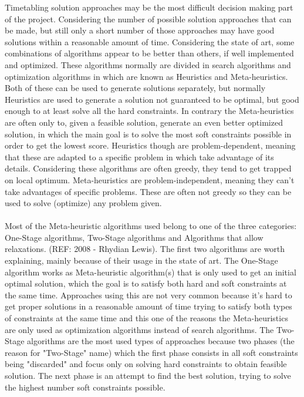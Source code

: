 Timetabling solution approaches may be the most difficult decision making part of the project. Considering the number of possible solution approaches that can be made, but still only a short number of those approaches may have good solutions within a reasonable amount of time. Considering the state of art, some combinations of algorithms appear to be better than others, if well implemented and optimized. These algorithms normally are divided in search algorithms and optimization algorithms in which are known as Heuristics and Meta-heuristics. Both of these can be used to generate solutions separately, but normally Heuristics are used to generate a solution not guaranteed to be optimal, but good enough to at least solve all the hard constraints. In contrary the Meta-heuristics are often only to, given a feasible solution, generate an even better optimized solution, in which the main goal is to solve the most soft constraints possible in order to get the lowest score. Heuristics though are problem-dependent, meaning that these are adapted to a specific problem in which take advantage of its details. Considering these algorithms are often greedy, they tend to get trapped on local optimum. Meta-heuristics are problem-independent, meaning they can't take advantages of specific problems. These are often not greedy so they can be used to solve (optimize) any problem given.\\
\\

Most of the Meta-heuristic algorithms used belong to one of the three categories: One-Stage algorithms, Two-Stage algorithms and Algorithms that allow relaxations. (REF: 2008 - Rhydian Lewis). The first two algorithms are worth explaining, mainly because of their usage in the state of art. The One-Stage algorithm works as Meta-heuristic algorithm(s) that is only used to get an initial optimal solution, which the goal is to satisfy both hard and soft constraints at the same time. Approaches using this are not very common because it's hard to get proper solutions in a reasonable amount of time trying to satisfy both types of constraints at the same time and this one of the reasons the Meta-heuristics are only used as optimization algorithms instead of search algorithms. The Two-Stage algorithms are the most used types of approaches because two phases (the reason for "Two-Stage" name) which the first phase consists in all soft constraints being "discarded" and focus only on solving hard constraints to obtain feasible solution. The next phase is an attempt to find the best solution, trying to solve the highest number soft constraints possible.\\
\\

